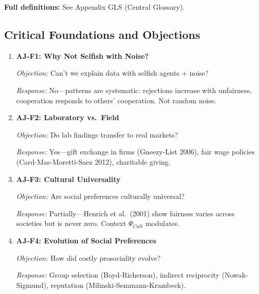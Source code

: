 \textbf{Full definitions:} See Appendix GLS (Central Glossary).

\subsection{Critical Foundations and Objections}
\label{sec:aj-foundations}


\begin{enumerate}
    \item \textbf{AJ-F1: Why Not Selfish with Noise?}

    \textit{Objection:} Can't we explain data with selfish agents + noise?

    \textit{Response:} No---patterns are systematic: rejections increase with
    unfairness, cooperation responds to others' cooperation. Not random noise.

    \item \textbf{AJ-F2: Laboratory vs.\ Field}

    \textit{Objection:} Do lab findings transfer to real markets?

    \textit{Response:} Yes---gift exchange in firms (Gneezy-List 2006), fair wage
    policies (Card-Mas-Moretti-Saez 2012), charitable giving.

    \item \textbf{AJ-F3: Cultural Universality}

    \textit{Objection:} Are social preferences culturally universal?

    \textit{Response:} Partially---Henrich et al.\ (2001) show fairness varies
    across societies but is never zero. Context $\Psi_{Cult}$ modulates.

    \item \textbf{AJ-F4: Evolution of Social Preferences}

    \textit{Objection:} How did costly prosociality evolve?

    \textit{Response:} Group selection (Boyd-Richerson), indirect reciprocity
    (Nowak-Sigmund), reputation (Milinski-Semmann-Krambeck).
\end{enumerate}

